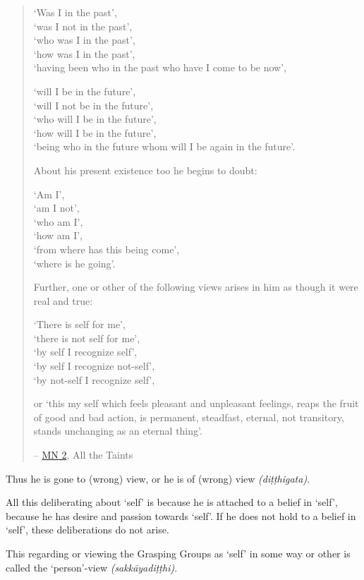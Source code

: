 \begin{quote}
\setlength{\parskip}{6pt}

`Was I in the past',\\
`was I not in the past',\\
`who was I in the past',\\
`how was I in the past',\\
`having been who in the past who have I come to be now',

`will I be in the future',\\
`will I not be in the future',\\
`who will I be in the future',\\
`how will I be in the future',\\
`being who in the future whom will I be again in the future'.

About his present existence too he begins to doubt:

`Am I',\\
`am I not',\\
`who am I',\\
`how am I',\\
`from where has this being come',\\
`where is he going'.

Further, one or other of the following views arises in him as though it were real and true:

`There is self for me',\\
`there is not self for me',\\
`by self I recognize self',\\
`by self I recognize not-self',\\
`by not-self I recognize self',

or `this my self which feels pleasant and unpleasant feelings, reaps the fruit of good and bad action, is permanent, steadfast, eternal, not transitory, stands unchanging as an eternal thing'.

-- \href{https://suttacentral.net/mn2/en/bodhi}{MN 2}, All the Taints
\end{quote}

Thus he is gone to (wrong) view, or he is of (wrong) view \emph{(diṭṭhigata)}.

All this deliberating about `self' is because he is attached to a belief in `self', because he has desire and passion towards `self'. If he does not hold to a belief in `self', these deliberations do not arise.

This regarding or viewing the Grasping Groups as `self' in some way or other is called the `person'-view \emph{(sakkāyadiṭṭhi)}.

